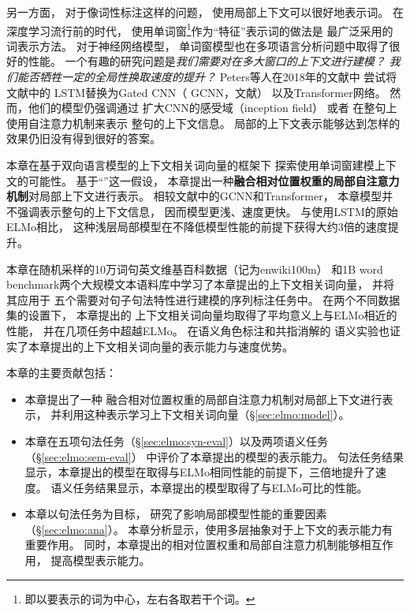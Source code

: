 另一方面，
对于像词性标注这样的问题，
使用局部上下文可以很好地表示词。
在深度学习流行前的时代，
使用单词窗\footnote{即以要表示的词为中心，左右各取若干个词。}作为``特征''表示词的做法是
最广泛采用的词表示方法\cite{collins:2002:EMNLP02,Ando:2005:FLP:1046920.1194905,W04-3212,mcdonald2006online}。
对于神经网络模型，
单词窗模型也在多项语言分析问题中取得了很好的性能\cite{Collobert:2011:NLP:1953048.2078186,D17-1283}。
一个有趣的研究问题是\textit{我们需要对在多大窗口的上下文进行建模？
我们能否牺牲一定的全局性换取速度的提升？}
Peters等人在2018年的文献中
尝试将文献中的
LSTM替换为Gated CNN（ GCNN，文献）
以及Transformer网络。
然而，他们的模型仍强调通过
扩大CNN的感受域（inception field）
或者
在整句上使用自注意力机制来表示
整句的上下文信息。
局部的上下文表示能够达到怎样的效果仍旧没有得到很好的答案。

本章在基于双向语言模型的上下文相关词向量的框架\cite{peters-EtAl:2018:N18-1}下
探索使用单词窗建模上下文的可能性。
基于``\chtwoassumption''这一假设，
本章提出一种\textbf{融合相对位置权重的局部自注意力机制}对局部上下文进行表示。
相较文献中的GCNN和Transformer，
本章模型并不强调表示整句的上下文信息，
因而模型更浅、速度更快。
与使用LSTM的原始ELMo相比，
这种浅层局部模型在不降低模型性能的前提下获得大约3倍的速度提升。

本章在随机采样的10万词句英文维基百科数据（记为enwiki100m）
和1B word benchmark两个大规模文本语料库中学习了本章提出的上下文相关词向量，
并将其应用于
五个需要对句子句法特性进行建模的序列标注任务\cite{reimers-gurevych:2017:EMNLP2017}中。
在两个不同数据集的设置下，
本章提出的
上下文相关词向量均取得了平均意义上与ELMo相近的性能，
并在几项任务中超越ELMo。
在语义角色标注\cite{W13-3516}和共指消解\cite{W12-4501}的
语义实验也证实了本章提出的上下文相关词向量的表示能力与速度优势。

本章的主要贡献包括：
\begin{itemize}
	\item 本章提出了一种
	融合相对位置权重的局部自注意力机制对局部上下文进行表示，
	并利用这种表示学习上下文相关词向量（\S\ref{sec:elmo:model}）。
	\item 本章在五项句法任务（\S\ref{sec:elmo:syn-eval}）以及两项语义任务（\S\ref{sec:elmo:sem-eval}）
	中评价了本章提出的模型的表示能力。
	句法任务结果显示，本章提出的模型在取得与ELMo相同性能的前提下，三倍地提升了速度。
	语义任务结果显示，本章提出的模型取得了与ELMo可比的性能。
	\item 本章以句法任务为目标，
	研究了影响局部模型性能的重要因素（\S\ref{sec:elmo:ana}）。
	本章分析显示，使用多层抽象对于上下文的表示能力有重要作用。
	同时，本章提出的相对位置权重和局部自注意力机制能够相互作用，
	提高模型表示能力。
\end{itemize}

